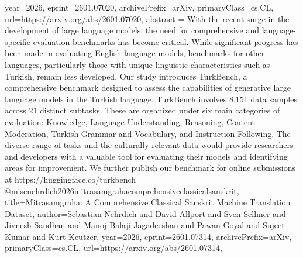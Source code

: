 {      year={2026},
      eprint={2601.07020},
      archivePrefix={arXiv},
      primaryClass={cs.CL},
      url={https://arxiv.org/abs/2601.07020},
      abstract = {With the recent surge in the development of large language models, the need for comprehensive and language-specific evaluation benchmarks has become critical. While significant progress has been made in evaluating English language models, benchmarks for other languages, particularly those with unique linguistic characteristics such as Turkish, remain less developed. Our study introduces TurkBench, a comprehensive benchmark designed to assess the capabilities of generative large language models in the Turkish language. TurkBench involves 8,151 data samples across 21 distinct subtasks. These are organized under six main categories of evaluation: Knowledge, Language Understanding, Reasoning, Content Moderation, Turkish Grammar and Vocabulary, and Instruction Following. The diverse range of tasks and the culturally relevant data would provide researchers and developers with a valuable tool for evaluating their models and identifying areas for improvement. We further publish our benchmark for online submissions at https://huggingface.co/turkbench}
}@misc{nehrdich2026mitrasamgrahacomprehensiveclassicalsanskrit,
      title={Mitrasamgraha: A Comprehensive Classical Sanskrit Machine Translation Dataset}, 
      author={Sebastian Nehrdich and David Allport and Sven Sellmer and Jivnesh Sandhan and Manoj Balaji Jagadeeshan and Pawan Goyal and Sujeet Kumar and Kurt Keutzer},
      year={2026},
      eprint={2601.07314},
      archivePrefix={arXiv},
      primaryClass={cs.CL},
      url={https://arxiv.org/abs/2601.07314},
}
